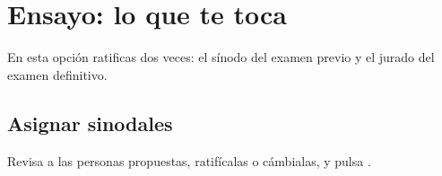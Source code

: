 \section{Ensayo: lo que te toca}
En esta opción ratificas dos veces: el sínodo del examen previo y el jurado del examen definitivo.
\subsection{Asignar sinodales}
Revisa a las personas propuestas, ratifícalas o cámbialas, y pulsa .

